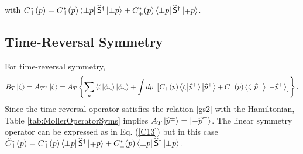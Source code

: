 %
with $C_{\pm}^*(p) = C_{\pm}^*(p) \bra{\pm p} \widehat{\mathsf{S}}^\dagger \ket{\pm p} + C_{\mp}^*(p) \bra{\pm p} \widehat{\mathsf{S}}^\dagger \ket{\mp p}$.

\subsection{Time-Reversal Symmetry}
%
For time-reversal symmetry,
%
\begin{equation}
    B_{T}\ket{\zeta} = A_{T}\tau\ket{\zeta} = A_{T} \left\{ \sum_n  \braket{\zeta}{\phi_n} \ket{\phi_n} + \int dp\; \left[ C_+(p) \braket{\zeta}{\widehat{p}^+}\ket{\widehat{p}^+} + C_-(p)\braket{\zeta}{\widehat{p}^+}\ket{-\widehat{p}^+} \right] \right\}.
\end{equation}
%
Since the time-reversal operator satisfies the relation \eqref{gs2} with the Hamiltonian, Table \ref{tab:MollerOperatorSyms} implies $A_T\ket{\widehat{p}^\pm} = \ket{-\widehat{p}^\mp}$. The linear symmetry operator can be expressed as in Eq. (\ref{C13}) but in this case $\tilde{C}_{\pm}^*(p) = C_{\pm}^*(p) \bra{\pm p} \widehat{\mathsf{S}}^\dagger \ket{\mp p} + C_{\mp}^*(p) \bra{\pm p} \widehat{\mathsf{S}}^\dagger \ket{\pm p}$.
